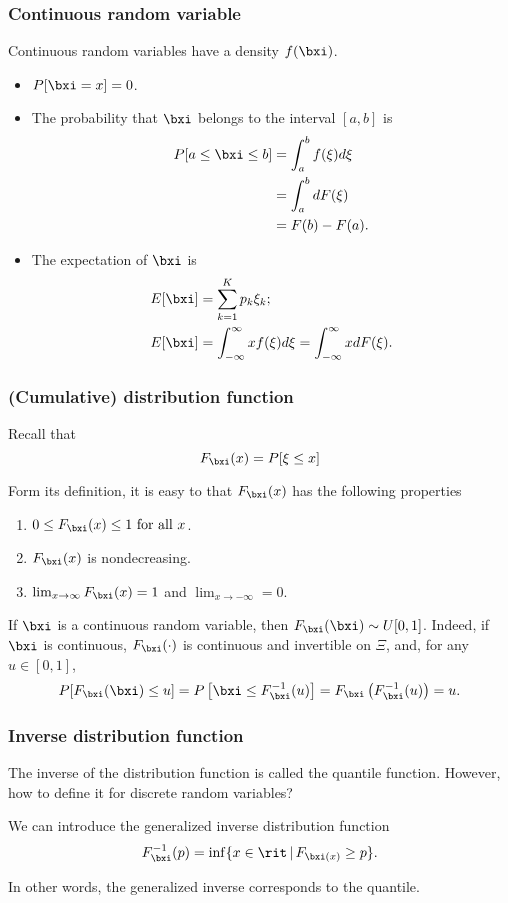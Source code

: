 \begin{frame}
\frametitle{Continuous random variable}

{\red Continuous random variables} have a density $f(\bxi)$.
\begin{itemize}
\item
$P[\bxi = x] = 0$.
\item
The probability that $\bxi$ belongs to the interval $[a,b]$ is
\begin{align*}
P[a \leq \bxi \leq b] & = \int_a^b f(\xi) d\xi\\
& = \int_a^b dF(\xi) \\
& = F(b)-F(a).
\end{align*}
\item
The {\blue expectation} of $\bxi$ is
\begin{align*}
E[\bxi] & = \sum_{k=1}^K p_k\xi_k; \\
E[\bxi] & = \int_{-\infty}^{\infty} x f(\xi)d\xi =
\int_{-\infty}^{\infty} x dF(\xi).
\end{align*}
\end{itemize}
\end{frame}

\begin{frame}
\frametitle{(Cumulative) distribution function}

Recall that
\[
F_{\bxi}(x) = P[\xi \leq x]
\]

Form its definition, it is easy to that $F_{\bxi}(x)$ has the following properties
\begin{enumerate}
\item
$0 \leq F_{\bxi}(x) \leq 1 \mbox{ for all } x$.
\item
$F_{\bxi}(x)$ is nondecreasing.
\item
$\lim_{x\rightarrow\infty} F_{\bxi}(x) = 1$ and $\lim_{x \rightarrow -\infty}
= 0$.
\end{enumerate}

\mbox{}

If $\bxi$ is a continuous random variable, then $F_{\bxi}(\bxi) \sim U[0,1]$.
Indeed, if $\bxi$ is continuous, $F_{\bxi}(\cdot)$ is continuous and invertible on $\Xi$, and, for any $u \in [0,1]$,
\[
P[F_{\bxi}(\bxi) \leq u] = P\left[\bxi \leq F^{-1}_{\bxi}(u)\right] = F_{\bxi}\left(F^{-1}_{\bxi}(u)\right) = u.
\]

\end{frame}

\begin{frame}
\frametitle{Inverse distribution function}

The inverse of the distribution function is called the quantile function.
However, how to define it for discrete random variables?

\mbox{}

We can introduce the {\red generalized inverse distribution function}
\[
F_{\bxi}^{-1}(p) = \inf\{x \in \rit \,|\, F_{\bxi(x)} \geq p\}.
\]

\mbox{}

In other words, the generalized inverse corresponds to the quantile.

\end{frame}


